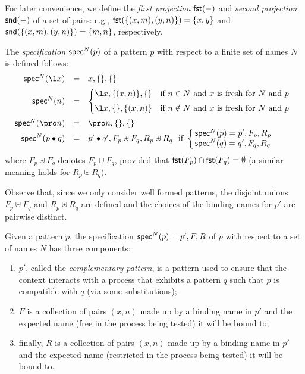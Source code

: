 \documentclass{LMCS}
\begin{document}
For later convenience, we define the {\em first projection} ${\sf fst}(-)$ and
{\em second projection} ${\sf snd}(-)$ of a set of pairs: e.g.,
${\sf fst}(\{(x,m),(y,n)\})=\{x,y\}$ and ${\sf snd}(\{(x,m),(y,n)\})=\{m,n\}$, respectively.


\begin{defi}
\label{def:bchar}
The {\em specification} ${\sf spec}^{N}(p)$ of a pattern $p$ with respect to a finite set of names $N$ is defined follows:
$$
\begin{array}{rcl}
\vspace{.2cm}
{\sf spec}^{N}(\l x) &=& x,\{\},\{\} \\
\vspace{.2cm}
{\sf spec}^{N}(n) &=& 
\left\{\!\!\!
\begin{array}{ll}
\vspace{.2cm}
\l x,\{(x,n)\},\{\} &\mbox{if $n\in N$ and $x$ is fresh for $N$ and $p$}\\
\l x,\{\},\{(x,n)\} &\mbox{if $n\notin N$ and $x$ is fresh for $N$ and $p$}
\end{array}
\right.
\\
{\sf spec}^{N}(\pro n) &=& \pro n,\{\},\{\}\\
{\sf spec}^{N}(p\bullet q) &=& p'\bullet q',F_p\uplus F_q,R_p\uplus R_q \ \mbox{ if }\left\{\!\!
\begin{array}{l}
{\sf spec}^{N}(p) = p',F_p,R_p\\
{\sf spec}^{N}(q) = q',F_q,R_q
\end{array}\right.
\end{array}
$$
where $F_p\uplus F_q$ denotes $F_p\cup F_q$, provided that ${\sf fst}(F_p) \cap {\sf fst}(F_q) = \emptyset$
(a similar meaning holds for $R_p\uplus R_q$).
\end{defi}
Observe that, since we only consider well formed patterns, the disjoint unions $F_p\uplus F_q$ and $R_p\uplus R_q$ are defined and the choices of the binding names for $p'$ are pairwise distinct.

Given a pattern $p$, the specification ${\sf spec}^{N}(p)=p',F,R$ of $p$ with respect to a set of names $N$ has three components:
\begin{enumerate}
\item $p'$, called the {\em complementary pattern}, is a pattern used to ensure that the context interacts with a 
process that exhibits a pattern $q$ such that $p$ is compatible with $q$ (via some substitutions);
\item $F$ is a collection of pairs $(x,n)$ made up by a binding name in $p'$ and the expected 
name (free in the process being tested) it will be bound to;
\item finally, $R$ is a collection of pairs $(x,n)$ made up by a binding name in $p'$ and the expected
name (restricted in the process being tested) it will be bound to.
\end{enumerate}
\end{document}
